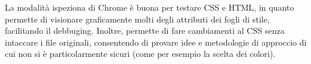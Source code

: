 La modalità ispeziona di Chrome è buona per testare CSS e HTML, in quanto permette di visionare graficamente molti
degli attributi dei fogli di stile, facilitando il debbuging. Inoltre, permette di fare cambiamenti al CSS senza intaccare i file originali,
consentendo di provare idee e metodologie di approccio di cui non si è particolarmente sicuri (come per esempio la scelta dei colori).